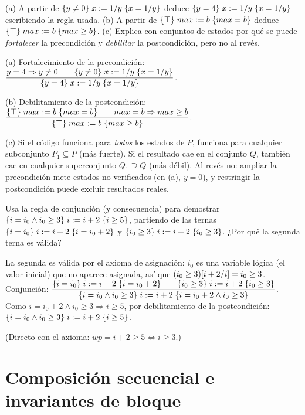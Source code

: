 \begin{prob}
(a) A partir de $\{y\neq0\}\;x\mathrel{:=} 1/y\;\{x=1/y\}$ deduce $\{y=4\}\;x\mathrel{:=}1/y\;\{x=1/y\}$ escribiendo la regla usada.
(b) A partir de $\{\top\}\;max\mathrel{:=} b\;\{max=b\}$ deduce $\{\top\}\;max\mathrel{:=} b\;\{max\ge b\}$.
(c) Explica con conjuntos de estados por qué se puede \emph{fortalecer} la precondición y \emph{debilitar} la postcondición, pero no al revés.
\end{prob}
\begin{sol}
(a) Fortalecimiento de la precondición:
$\dfrac{y=4\Rightarrow y\ne0\qquad\{y\ne0\}\;x\mathrel{:=}1/y\;\{x=1/y\}}{\{y=4\}\;x\mathrel{:=}1/y\;\{x=1/y\}}$.

(b) Debilitamiento de la postcondición:
$\dfrac{\{\top\}\;max\mathrel{:=} b\;\{max=b\}\qquad max=b\Rightarrow max\ge b}{\{\top\}\;max\mathrel{:=} b\;\{max\ge b\}}$.

(c) Si el código funciona para \emph{todos} los estados de $P$, funciona para cualquier subconjunto $P_1\subseteq P$ (más fuerte). Si el resultado cae en el conjunto $Q$, también cae en cualquier superconjunto $Q_1\supseteq Q$ (más débil). Al revés no: ampliar la precondición mete estados no verificados (en (a), $y=0$), y restringir la postcondición puede excluir resultados reales.
\end{sol}

\begin{prob}
Usa la regla de conjunción (y consecuencia) para demostrar $\{i=i_0\land i_0\ge3\}\;i\mathrel{:=} i+2\;\{i\ge5\}$, partiendo de las ternas $\{i=i_0\}\;i\mathrel{:=} i+2\;\{i=i_0+2\}$ y $\{i_0\ge3\}\;i\mathrel{:=} i+2\;\{i_0\ge3\}$. ¿Por qué la segunda terna es válida?
\end{prob}
\begin{sol}
La segunda es válida por el axioma de asignación: $i_0$ es una variable lógica (el valor inicial) que no aparece asignada, así que $(i_0\ge3)[i+2/i]=i_0\ge3$.
Conjunción:
$\dfrac{\{i=i_0\}\;i\mathrel{:=} i+2\;\{i=i_0+2\}\qquad\{i_0\ge3\}\;i\mathrel{:=} i+2\;\{i_0\ge3\}}{\{i=i_0\land i_0\ge3\}\;i\mathrel{:=} i+2\;\{i=i_0+2\land i_0\ge3\}}$.
Como $i=i_0+2\land i_0\ge3\Rightarrow i\ge5$, por debilitamiento de la postcondición: $\{i=i_0\land i_0\ge3\}\;i\mathrel{:=} i+2\;\{i\ge5\}$. \checkmark

(Directo con el axioma: $wp=i+2\ge5\iff i\ge3$.)
\end{sol}

\section{Composición secuencial e invariantes de bloque}

